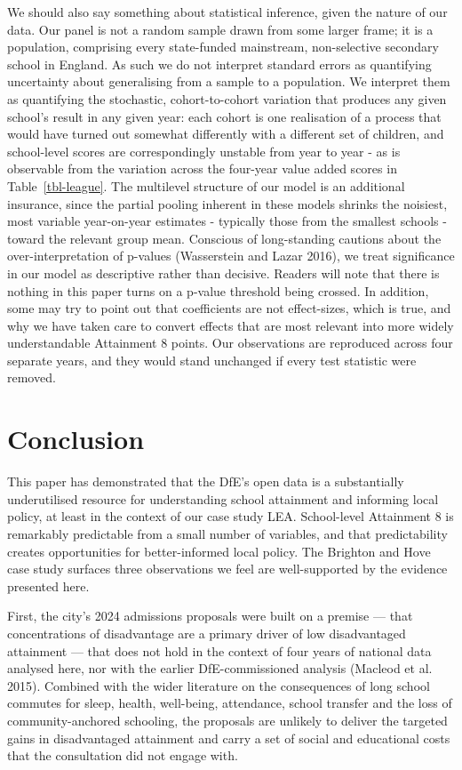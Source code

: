 \documentclass[
  12pt,
  titlepage]{article}
\begin{document}
We should also say something about statistical inference, given the
nature of our data. Our panel is not a random sample drawn from some
larger frame; it is a population, comprising every state-funded
mainstream, non-selective secondary school in England. As such we do not
interpret standard errors as quantifying uncertainty about generalising
from a sample to a population. We interpret them as quantifying the
stochastic, cohort-to-cohort variation that produces any given school's
result in any given year: each cohort is one realisation of a process
that would have turned out somewhat differently with a different set of
children, and school-level scores are correspondingly unstable from year
to year - as is observable from the variation across the four-year value
added scores in Table~\ref{tbl-league}. The multilevel structure of our
model is an additional insurance, since the partial pooling inherent in
these models shrinks the noisiest, most variable year-on-year estimates
- typically those from the smallest schools - toward the relevant group
mean. Conscious of long-standing cautions about the over-interpretation
of p-values (Wasserstein and Lazar 2016), we treat significance in our
model as descriptive rather than decisive. Readers will note that there
is nothing in this paper turns on a p-value threshold being crossed. In
addition, some may try to point out that coefficients are not
effect-sizes, which is true, and why we have taken care to convert
effects that are most relevant into more widely understandable
Attainment 8 points. Our observations are reproduced across four
separate years, and they would stand unchanged if every test statistic
were removed.

\section{Conclusion}\label{conclusion}

This paper has demonstrated that the DfE's open data is a substantially
underutilised resource for understanding school attainment and informing
local policy, at least in the context of our case study LEA.
School-level Attainment 8 is remarkably predictable from a small number
of variables, and that predictability creates opportunities for
better-informed local policy. The Brighton and Hove case study surfaces
three observations we feel are well-supported by the evidence presented
here.

First, the city's 2024 admissions proposals were built on a premise ---
that concentrations of disadvantage are a primary driver of low
disadvantaged attainment --- that does not hold in the context of four
years of national data analysed here, nor with the earlier
DfE-commissioned analysis (Macleod et al. 2015). Combined with the wider
literature on the consequences of long school commutes for sleep,
health, well-being, attendance, school transfer and the loss of
community-anchored schooling, the proposals are unlikely to deliver the
targeted gains in disadvantaged attainment and carry a set of social and
educational costs that the consultation did not engage with.
\end{document}
